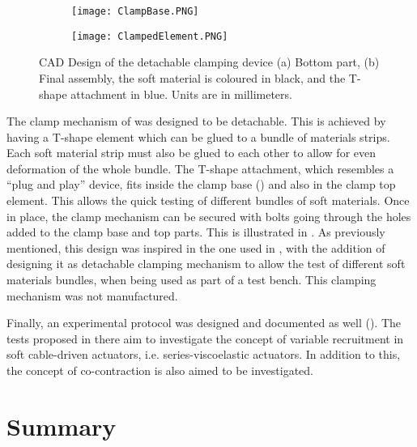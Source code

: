 \begin{figure}[htb!]
	\centering
    \begin{subfigure}[b]{0.49\textwidth}
        \centering
        \texttt{[image: ClampBase.PNG]}
        \caption{}
        \label{fig:ClampBase}
    \end{subfigure}
    \begin{subfigure}[b]{0.49\textwidth}
        \centering
        \texttt{[image: ClampedElement.PNG]}
        \caption{}
        \label{fig:ClampElement}
    \end{subfigure}
    \caption{CAD Design of the detachable clamping device (a) Bottom part, (b) Final assembly, the soft material is coloured in black, and the T-shape attachment in blue. Units are in millimeters.}
    \label{fig:ClampWhole}
\end{figure}

The clamp mechanism of  was designed to be detachable. This is achieved by having a T-shape element which can be glued to a bundle of materials strips. Each soft material strip must also be glued to each other to allow for even deformation of the whole bundle. The T-shape attachment, which resembles a ``plug and play'' device, fits inside the clamp base () and also in the clamp top element. This allows the quick testing of different bundles of soft materials. Once in place, the clamp mechanism can be secured with bolts going through the holes added to the clamp base and top parts. This is illustrated in . As previously mentioned, this design was inspired in the one used in \cite{austin2015control}, with the addition of designing it as detachable clamping mechanism to allow the test of different soft materials bundles, when being used as part of a test bench. This clamping mechanism was not manufactured.

Finally, an experimental protocol was designed and documented as well (). The tests proposed in there aim to investigate the concept of variable recruitment in soft cable-driven actuators, i.e. series-viscoelastic actuators. In addition to this, the concept of co-contraction is also aimed to be investigated.

\section{Summary}

